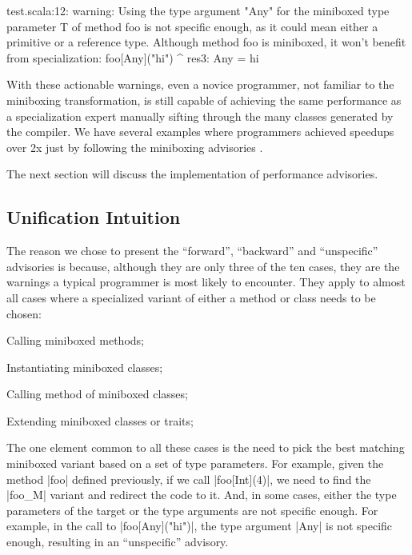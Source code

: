 \begin{lstlisting-nobreak-nolang}
test.scala:12: warning: Using the type argument "Any" for the miniboxed type parameter T of method foo is not specific enough, as it could mean either a primitive or a reference type. Although method foo is miniboxed, it won't benefit from specialization:
              foo[Any]("hi")
                   ^
res3: Any = hi
\end{lstlisting-nobreak-nolang}

With these actionable warnings, even a novice programmer, not familiar to the miniboxing transformation, is still capable of achieving the same performance as a specialization expert manually sifting through the many classes generated by the compiler. We have several examples where programmers achieved speedups over 2x just by following the miniboxing advisories \cite{miniboxing-www}.

The next section will discuss the implementation of performance advisories.

\subsection{Unification Intuition}

The reason we chose to present the ``forward'', ``backward'' and ``unspecific'' advisories is because, although they are only three of the ten cases, they are the warnings a typical programmer is most likely to encounter. They apply to almost all cases where a specialized variant of either a method or class needs to be chosen:

\begin{compactitem}
 \item Calling miniboxed methods;
 \item Instantiating miniboxed classes;
 \item Calling method of miniboxed classes;
 \item Extending miniboxed classes or traits;
\end{compactitem}

The one element common to all these cases is the need to pick the best matching miniboxed variant based on a set of type parameters. For example, given the method |foo| defined previously, if we call |foo[Int](4)|, we need to find the |foo_M| variant and redirect the code to it. And, in some cases, either the type parameters of the target or the type arguments are not specific enough. For example, in the call to |foo[Any]("hi")|, the type argument |Any| is not specific enough, resulting in an ``unspecific'' advisory.

